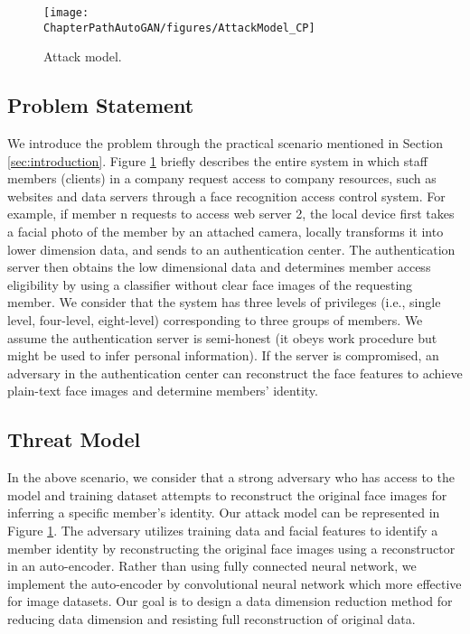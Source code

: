 
  
\begin{figure}[h]
	\texttt{[image: \\ChapterPathAutoGAN/figures/AttackModel\_CP]}
	\caption{Attack model.}
	\label{fig:attackmodel}
\end{figure} 

\subsection{Problem Statement}
We introduce the problem through the practical scenario mentioned in Section \ref{sec:introduction}. Figure \ref{fig:attackmodel} briefly describes the entire system in which staff members (clients) in a company request access to company resources, such as websites and data servers through a face recognition access control system. For example, if member n requests to access web server 2, the local device first takes a facial photo of the member by an attached camera, locally transforms it into lower dimension data, and sends to an authentication center. The authentication server then obtains the low dimensional data and determines member access eligibility by using a classifier without clear face images of the requesting member. We consider that the system has three levels of privileges (i.e., single level, four-level, eight-level) corresponding to three groups of members. We assume the authentication server is semi-honest (it obeys work procedure but might be used to infer personal information). If the server is compromised, an adversary in the authentication center can reconstruct the face features to achieve plain-text face images and determine members' identity.  
\subsection{Threat Model}
In the above scenario, we consider that a strong adversary who has access to the model and training dataset attempts to reconstruct the original face images for inferring a specific member's identity. Our attack model can be represented in Figure \ref{fig:attackmodel}. The adversary utilizes training data and facial features to identify a member identity by reconstructing the original face images using a reconstructor in an auto-encoder. Rather than using fully connected neural network, we implement the auto-encoder by convolutional neural network which more effective for image datasets. Our goal is to design a data dimension reduction method for reducing data dimension and resisting full reconstruction of original data.  

